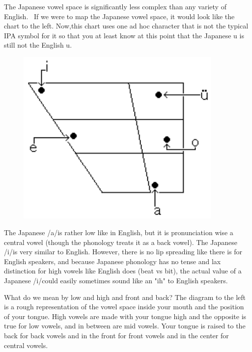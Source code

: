 \par{ The Japanese vowel space is significantly less complex than any variety of English.  If we were to map the Japanese vowel space, it would look like the chart to the left. Now,this chart uses one ad hoc character that is not the typical IPA symbol for it so that you at least know at this point that the Japanese u is still not the English u. 
\begin{figure}[h]
\centering

\includegraphics[width=0.9\textwidth]{figs/第08章/第366課:_japanesephonology_fig/Vowel_chart.png}

\end{figure}
}

\par{The Japanese \slash a\slash  is rather low like in English, but it is pronunciation wise a central vowel (though the phonology treats it as a back vowel). The Japanese \slash i\slash  is very similar to English. However, there is no lip spreading like there is for English speakers, and because Japanese phonology has no tense and lax distinction for high vowels like English does (beat vs bit), the actual value of a Japanese \slash i\slash  could easily sometimes sound like an "ih" to English speakers. }

\par{What do we mean by low and high and front and back? The diagram to the left is a rough representation of the vowel space inside your mouth and the position of your tongue. High vowels are made with your tongue high and the opposite is true for low vowels, and in between are mid vowels. Your tongue is raised to the back for back vowels and in the front for front vowels and in the center for central vowels. }

